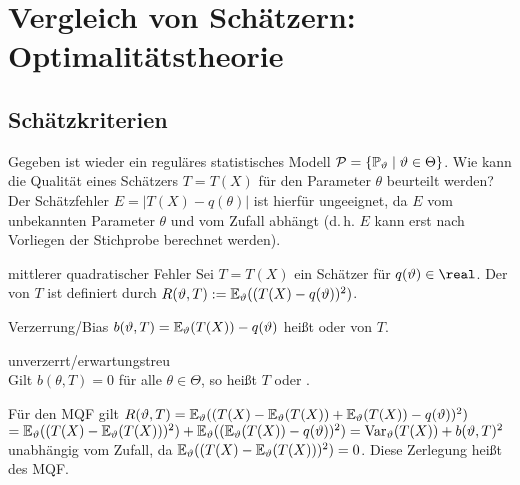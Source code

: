 \chapter{%
    Vergleich von Schätzern: Optimalitätstheorie%
}

\section{%
    Schätzkriterien%
}

\begin{Bem}
    Gegeben ist wieder ein reguläres statistisches Modell
    $\mathcal{P} = \{\mathbb{P}_\vartheta \;|\; \vartheta \in \Theta\}$.
    Wie kann die Qualität eines Schätzers $T = T(X)$ für den Parameter $\theta$ beurteilt werden?\\
    Der Schätzfehler $E = |T(X) - q(\theta)|$ ist hierfür ungeeignet, da
    $E$ vom unbekannten Parameter $\theta$ und vom Zufall abhängt
    (d.\,h. $E$ kann erst nach Vorliegen der Stichprobe berechnet werden).
\end{Bem}

\begin{Def}{mittlerer quadratischer Fehler}
    Sei $T = T(X)$ ein Schätzer für $q(\theta) \in \real$.
    Der  von $T$ ist definiert durch
    $R(\vartheta, T) := \mathbb{E}_\vartheta((T(X) - q(\vartheta))^2)$.
\end{Def}

\begin{Def}{Verzerrung/Bias}
    $b(\vartheta, T) = \mathbb{E}_\vartheta(T(X)) - q(\vartheta)$ heißt 
    oder  von $T$.
\end{Def}

\begin{Def}{unverzerrt/erwartungstreu}\\
    Gilt $b(\theta, T) = 0$ für alle $\theta \in \Theta$, so heißt
    $T$  oder .
\end{Def}

\begin{Bem}
    Für den MQF gilt
    $R(\vartheta, T) = \mathbb{E}_\vartheta((T(X) - \mathbb{E}_\vartheta(T(X)) + \mathbb{E}_\vartheta(T(X)) - q(\vartheta))^2)$\\
    $= \mathbb{E}_\vartheta((T(X) - \mathbb{E}_\vartheta(T(X)))^2) + \mathbb{E}_\vartheta((\mathbb{E}_\vartheta(T(X)) - q(\vartheta))^2)
    = \mathrm{Var}_\vartheta(T(X)) + b(\vartheta, T)^2$
    unabhängig vom Zufall, da $\mathbb{E}_\vartheta((T(X) - \mathbb{E}_\vartheta(T(X)))^2) = 0$.
    Diese Zerlegung heißt  des MQF.
\end{Bem}

